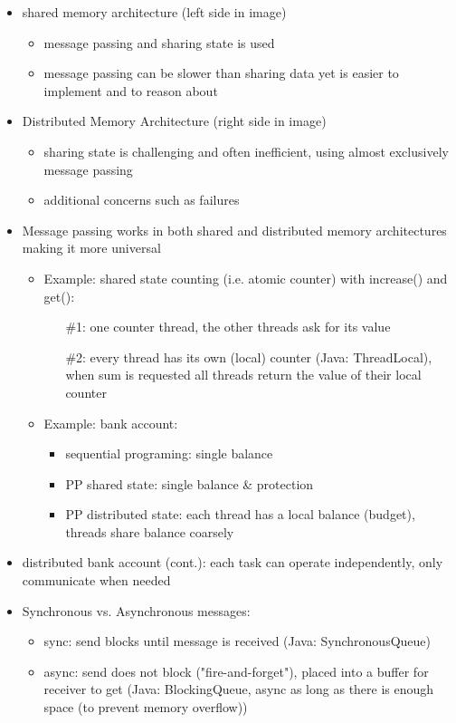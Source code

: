 \documentclass[a4paper]{article}
\begin{document}
\begin{itemize}
\item shared memory architecture (left side in image)
\begin{itemize}
\item message passing and sharing state is used
\item message passing can be slower than sharing data yet is easier to implement and to reason about 
\end{itemize}
\item Distributed Memory Architecture (right side in image)
\begin{itemize}
\item sharing state is challenging and often inefficient, using almost exclusively message passing
\item additional concerns such as failures
\end{itemize}
\item Message passing works in both shared and distributed memory architectures making it more universal
\begin{itemize}
\item Example: shared state counting (i.e. atomic counter) with increase() and get(): 
\begin{enumerate}
\item[\#1:] one counter thread, the other threads ask for its value
\item[\#2:] every thread has its own (local) counter (Java: ThreadLocal), when sum is requested all threads return the value of their local counter
\end{enumerate}
\item Example: bank account: 
\begin{itemize}
\item sequential programing: single balance
\item PP shared state: single balance \& protection
\item PP distributed state: each thread has a local balance (budget), threads share balance coarsely 
\end{itemize}
\end{itemize}
\item distributed bank account (cont.): each task can operate independently, only communicate when needed
\item Synchronous vs. Asynchronous messages: 
\begin{itemize}
\item sync: send blocks until message is received (Java: SynchronousQueue)
\item async: send does not block ("fire-and-forget"), placed into a buffer for receiver to get (Java: BlockingQueue, async as long as there is enough space (to prevent memory overflow))

\end{itemize}
\end{itemize}
\end{document}
